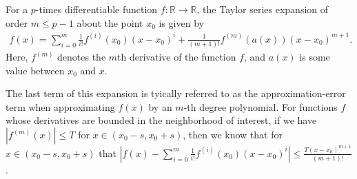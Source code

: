 
For a $p$-times differentiable function $f: \mathbb{R} \to \mathbb{R}$, the Taylor series expansion of order $m \leq p - 1$ about the point $x_0$ is given by
\begin{align}
f(x) = \sum_{i = 0}^m \frac{1}{i!} f^{(i)}(x_0) (x - x_0)^i + \frac{1}{(m + 1)!} f^{(m)}(a(x)) (x - x_0)^{m + 1}.
\end{align}
Here, $f^{(m)}$ denotes the $m$th derivative of the function $f$, and $a(x)$ is some value between $x_0$ and $x$.

The last term of this expansion is tyically referred to as the approximation-error term when approximating $f(x)$ by an $m$-th degree polynomial. For functions $f$ whose derivatives are bounded in the neighborhood of interest, if we have $|f^{(m)}(x)| \leq T$ for $x\in (x_0 - s, x_0 + s)$, then we know that for $x\in (x_0 -s, x_0 + s)$ that $|f(x) - \sum_{i = 0}^m \frac{1}{i!} f^{(i)}(x_0) (x - x_0)^i| \leq \frac{T(x-x_0)^{m+1}}{(m + 1)!}$. 

